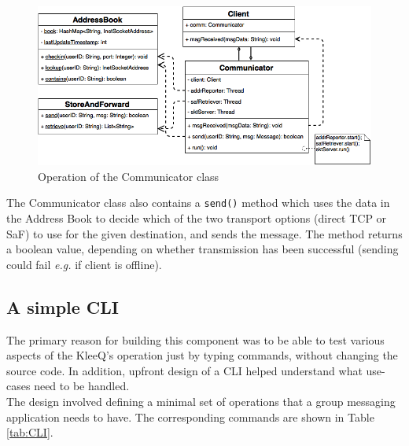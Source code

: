 \documentclass[a4paper, 12pt]{report}
\begin{document}
\begin{figure}[H]
\centering
\includegraphics[width = 0.8 \linewidth]{pics/communicator_uml.png}
\caption{\label{fig:communicator_uml} Operation of the Communicator class}
\end{figure}


The Communicator class also contains a \texttt{send()} method which uses the data in the Address Book to decide which of the two transport options (direct TCP or SaF) to use for the given destination, and sends the message. The method returns a boolean value, depending on whether transmission has been successful (sending could fail \textit{e.g.} if client is offline).


\subsection{A simple CLI}
\label{subsec:impl.prep.CLI}
The primary reason for building this component was to be able to test various aspects of the KleeQ's operation just by typing commands, without changing the source code. In addition, upfront design of a CLI helped understand what use-cases need to be handled. \\

The design involved defining a minimal set of operations that a group messaging application needs to have. The corresponding commands are shown in Table \ref{tab:CLI}.
\end{document}
